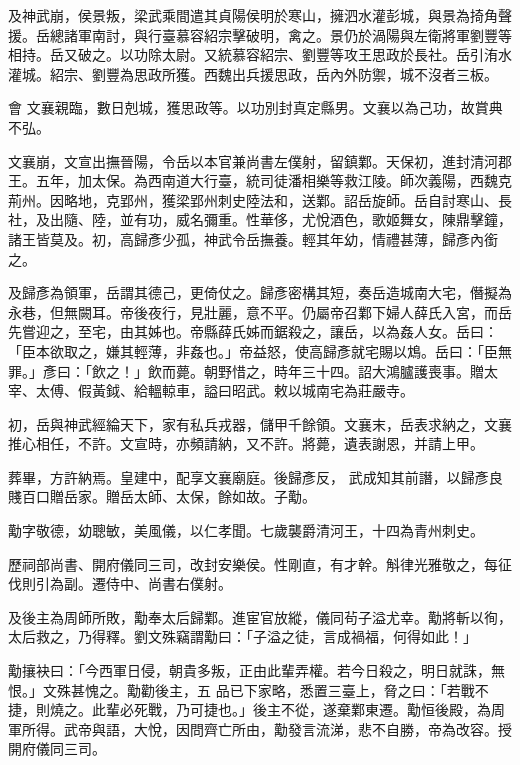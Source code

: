 \begin{pinyinscope}
 及神武崩，侯景叛，梁武乘間遣其貞陽侯明於寒山，擁泗水灌彭城，與景為掎角聲援。岳總諸軍南討，與行臺慕容紹宗擊破明，禽之。景仍於渦陽與左衛將軍劉豐等相持。岳又破之。以功除太尉。又統慕容紹宗、劉豐等攻王思政於長社。岳引洧水灌城。紹宗、劉豐為思政所獲。西魏出兵援思政，岳內外防禦，城不沒者三板。



 會
 文襄親臨，數日剋城，獲思政等。以功別封真定縣男。文襄以為己功，故賞典不弘。



 文襄崩，文宣出撫晉陽，令岳以本官兼尚書左僕射，留鎮鄴。天保初，進封清河郡王。五年，加太保。為西南道大行臺，統司徒潘相樂等救江陵。師次義陽，西魏克荊州。因略地，克郢州，獲梁郢州刺史陸法和，送鄴。詔岳旋師。岳自討寒山、長社，及出隨、陸，並有功，威名彌重。性華侈，尤悅酒色，歌姬舞女，陳鼎擊鐘，諸王皆莫及。初，高歸彥少孤，神武令岳撫養。輕其年幼，情禮甚薄，歸彥內銜之。



 及歸彥為領軍，岳謂其德己，更倚仗之。歸彥密構其短，奏岳造城南大宅，僭擬為
 永巷，但無闕耳。帝後夜行，見壯麗，意不平。仍屬帝召鄴下婦人薛氏入宮，而岳先嘗迎之，至宅，由其姊也。帝縣薛氏姊而鋸殺之，讓岳，以為姦人女。岳曰：「臣本欲取之，嫌其輕薄，非姦也。」帝益怒，使高歸彥就宅賜以鴆。岳曰：「臣無罪。」彥曰：「飲之！」飲而薨。朝野惜之，時年三十四。詔大鴻臚護喪事。贈太宰、太傅、假黃鉞、給轀輬車，謚曰昭武。敕以城南宅為莊嚴寺。



 初，岳與神武經綸天下，家有私兵戎器，儲甲千餘領。文襄末，岳表求納之，文襄推心相任，不許。文宣時，亦頻請納，又不許。將薨，遺表謝恩，并請上甲。



 葬畢，方許納焉。皇建中，配享文襄廟庭。後歸彥反，
 武成知其前譖，以歸彥良賤百口贈岳家。贈岳太師、太保，餘如故。子勱。



 勱字敬德，幼聰敏，美風儀，以仁孝聞。七歲襲爵清河王，十四為青州刺史。



 歷祠部尚書、開府儀同三司，改封安樂侯。性剛直，有才幹。斛律光雅敬之，每征伐則引為副。遷侍中、尚書右僕射。



 及後主為周師所敗，勱奉太后歸鄴。進宦官放縱，儀同茍子溢尤幸。勱將斬以徇，太后救之，乃得釋。劉文殊竊謂勱曰：「子溢之徒，言成禍福，何得如此！」



 勱攘袂曰：「今西軍日侵，朝貴多叛，正由此輩弄權。若今日殺之，明日就誅，無恨。」文殊甚愧之。勱勸後主，五
 品已下家略，悉置三臺上，脅之曰：「若戰不捷，則燒之。此輩必死戰，乃可捷也。」後主不從，遂棄鄴東遷。勱恒後殿，為周軍所得。武帝與語，大悅，因問齊亡所由，勱發言流涕，悲不自勝，帝為改容。授開府儀同三司。




\end{pinyinscope}
